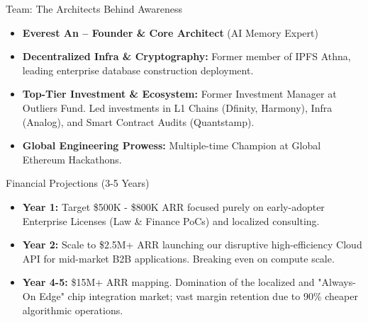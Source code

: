 ﻿\documentclass[aspectratio=169, 10pt]{beamer}
\begin{document}
\begin{frame}{Team: The Architects Behind Awareness}
\begin{itemize}
    \item \textbf{Everest An -- Founder \& Core Architect} (AI Memory Expert)
    \vspace{0.5em}
    \item \textbf{Decentralized Infra \& Cryptography:} Former member of IPFS Athna, leading enterprise database construction deployment.
    \item \textbf{Top-Tier Investment \& Ecosystem:} Former Investment Manager at Outliers Fund. Led investments in L1 Chains (Dfinity, Harmony), Infra (Analog), and Smart Contract Audits (Quantstamp).
    \item \textbf{Global Engineering Prowess:} Multiple-time Champion at Global Ethereum Hackathons.
\end{itemize}
\end{frame}

\begin{frame}{Financial Projections (3-5 Years)}
\begin{itemize}
    \item \textbf{Year 1:} Target \$500K - \$800K ARR focused purely on early-adopter Enterprise Licenses (Law \& Finance PoCs) and localized consulting.
    \item \textbf{Year 2:} Scale to \$2.5M+ ARR launching our disruptive high-efficiency Cloud API for mid-market B2B applications. Breaking even on compute scale.
    \item \textbf{Year 4-5:} \$15M+ ARR mapping. Domination of the localized and "Always-On Edge" chip integration market; vast margin retention due to 90\% cheaper algorithmic operations.
\end{itemize}
\end{frame}
\end{document}
